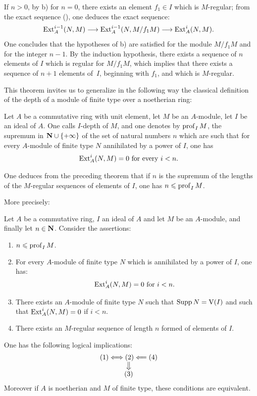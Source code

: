 If \(n>0\), by b) for \(n=0\), there exists an element \(f_1\in I\)
which is \(M\)-regular; from the exact sequence (), one
deduces the exact sequence:
\begin{equation} \label{eq:III.2.2} \Ext_A^{i-1} (N, M) \to \Ext_A^{i-1} (N, M/f_1M) \to \Ext_A^i (N, M).
\end{equation}
One concludes that the hypotheses of b) are satisfied for the
module \(M/f_1M\) and for the integer \(n-1\). By the induction
hypothesis, there exists a sequence of \(n\) elements of \(I\) which is
regular for \(M/f_1M\), which implies that there exists a
sequence of \(n+1\) elements of~\(I\), beginning with \(f_1\), and which
is \(M\)-regular.

This theorem invites us to generalize in the following way the classical
definition of the depth of a module of finite type over a noetherian
ring:

\begin{definition} \label{III.2.3}
Let \(A\) be a commutative ring with unit element, let \(M\) be an
\(A\)-module, let \(I\) be an ideal of \(A\). One calls \(I\)-depth of
\(M\), and one denotes by \(\operatorname{prof}_I M\), the supremum in
\(\mathbf{N}\cup\{+\infty\}\) of the set of natural numbers \(n\) which are
such that for every \(A\)-module of finite type \(N\) annihilated by a
power of \(I\), one has
\[
\operatorname{Ext}_A^i(N, M)=0 \text{ for every } i< n.
\]
\end{definition}

One deduces from the preceding theorem that if \(n\) is the supremum of
the lengths of the \(M\)-regular sequences of elements of \(I\), one
has \(n\leqslant\operatorname{prof}_I M\).

\noindent More precisely:

\begin{proposition} \label{III.2.4}
Let \(A\) be a commutative ring, \(I\) an ideal of \(A\) and let \(M\)
be an \(A\)-module, and finally let \(n\in \mathbf{N}\). Consider the
assertions:
\begin{enumerate}
\item
\(n\leqslant \operatorname{prof}_I M\).
\item
For every \(A\)-module of finite type \(N\) which is annihilated by a
power of \(I\), one has:
\[
\operatorname{Ext}_A^i(N, M)=0 \text{ for } i<n.
\]
\item
There exists an \(A\)-module of finite type \(N\) such that
\(\operatorname{Supp} N = \operatorname{V}(I)\) and such that \(\operatorname{Ext}_A^i(N, M)=0\) if
\(i<n\).
\item
There exists an \(M\)-regular sequence of length \(n\) formed of
elements of \(I\).
\end{enumerate}

One has the following logical implications:
\[
\begin{array}{c}\dpl \textup{(1)} \Ssi \textup{(2)} \From (4) \\
\big\Downarrow \\
\textup{(3)} \\
\end{array}
\]
Moreover if \(A\) is noetherian and \(M\) of finite type, these
conditions are equivalent.
\end{proposition}

